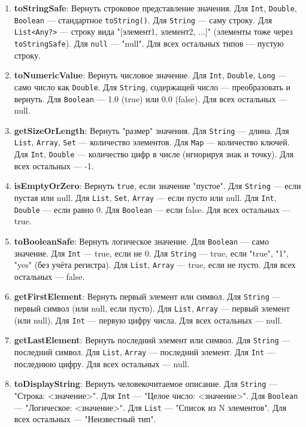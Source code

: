 \begin{enumerate}
    \item \textbf{toStringSafe}: Вернуть строковое представление значения. Для \texttt{Int}, \texttt{Double}, \texttt{Boolean} — стандартное \texttt{toString()}. Для \texttt{String} — саму строку. Для \texttt{List<Any?>} — строку вида "[элемент1, элемент2, ...]" (элементы тоже через \texttt{toStringSafe}). Для \texttt{null} — "null". Для всех остальных типов — пустую строку.
    \item \textbf{toNumericValue}: Вернуть числовое значение. Для \texttt{Int}, \texttt{Double}, \texttt{Long} — само число как \texttt{Double}. Для \texttt{String}, содержащей число — преобразовать и вернуть. Для \texttt{Boolean} — 1.0 (true) или 0.0 (false). Для всех остальных — null.
    \item \textbf{getSizeOrLength}: Вернуть "размер" значения. Для \texttt{String} — длина. Для \texttt{List}, \texttt{Array}, \texttt{Set} — количество элементов. Для \texttt{Map} — количество ключей. Для \texttt{Int}, \texttt{Double} — количество цифр в числе (игнорируя знак и точку). Для всех остальных — -1.
    \item \textbf{isEmptyOrZero}: Вернуть \texttt{true}, если значение "пустое". Для \texttt{String} — если пустая или null. Для \texttt{List}, \texttt{Set}, \texttt{Array} — если пусто или null. Для \texttt{Int}, \texttt{Double} — если равно 0. Для \texttt{Boolean} — если false. Для всех остальных — true.
    \item \textbf{toBooleanSafe}: Вернуть логическое значение. Для \texttt{Boolean} — само значение. Для \texttt{Int} — true, если не 0. Для \texttt{String} — true, если "true", "1", "yes" (без учёта регистра). Для \texttt{List}, \texttt{Array} — true, если не пусто. Для всех остальных — false.
    \item \textbf{getFirstElement}: Вернуть первый элемент или символ. Для \texttt{String} — первый символ (или null, если пусто). Для \texttt{List}, \texttt{Array} — первый элемент (или null). Для \texttt{Int} — первую цифру числа. Для всех остальных — null.
    \item \textbf{getLastElement}: Вернуть последний элемент или символ. Для \texttt{String} — последний символ. Для \texttt{List}, \texttt{Array} — последний элемент. Для \texttt{Int} — последнюю цифру. Для всех остальных — null.
    \item \textbf{toDisplayString}: Вернуть человекочитаемое описание. Для \texttt{String} — "Строка: <значение>". Для \texttt{Int} — "Целое число: <значение>". Для \texttt{Boolean} — "Логическое: <значение>". Для \texttt{List} — "Список из N элементов". Для всех остальных — "Неизвестный тип".

\end{enumerate}
